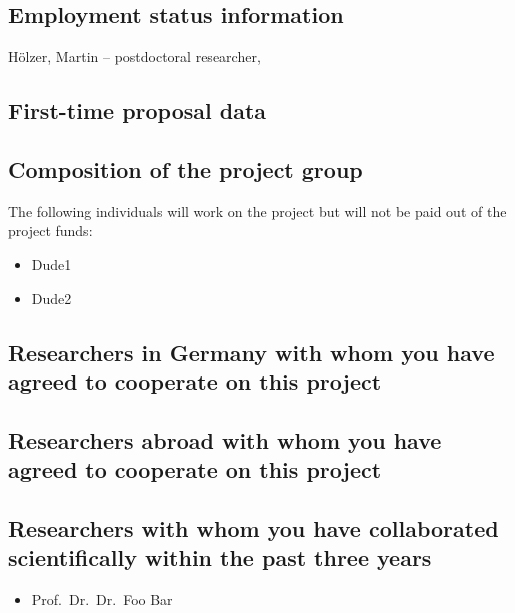 \subsection{Employment status information}
H\"olzer, Martin -- postdoctoral researcher, 

\subsection{First-time proposal data}

\subsection{Composition of the project group}
The following individuals will work on the project but will not be paid out of
the project funds:

\begin{itemize}
	\item Dude1
	\item Dude2
\end{itemize}

\subsection{Researchers in Germany with whom you have agreed to cooperate on this project}

\subsection{Researchers abroad with whom you have agreed to cooperate on this project}

\subsection{Researchers with whom you have collaborated scientifically within the past three years}
\begin{itemize}
	\item Prof.\ Dr.\ Dr.\ Foo Bar
\end{itemize}

